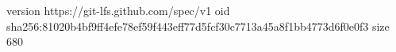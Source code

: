 version https://git-lfs.github.com/spec/v1
oid sha256:81020b4bf9ff4efe78ef59f443eff77d5fcf30c7713a45a8f1bb4773d6f0e0f3
size 680
